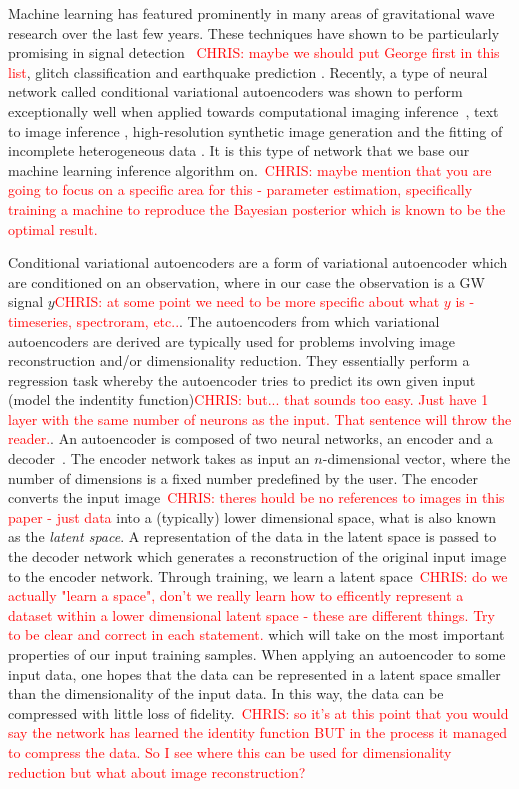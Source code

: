 \documentclass[%
showpacs,
 amsmath,amssymb,
 aps,
 twocolumn,
 prl,
 reprint,
floatfix,
]{revtex4-1}
\newcommand{\chris}[1]{\textcolor{red}{CHRIS: #1}}
\begin{document}
%
%
Machine learning has featured prominently in many areas of gravitational wave
research over the last few years. These techniques have shown to be
particularly promising in signal detection
\cite{PhysRevLett.120.141103,GEORGE201864,1904.08693}~\chris{maybe we should
put George first in this list}, glitch classification
\cite{1706.07446,0264-9381-34-6-064003} and earthquake prediction
\cite{Coughlin_2017}. Recently, a type of neural network called conditional
variational autoencoders was shown to perform exceptionally well when applied
towards computational imaging inference~\cite{1904.06264,NIPS2015_5775}, text
to image inference \cite{1512.00570}, high-resolution synthetic image
generation \cite{1612.00005} and the fitting of incomplete heterogeneous data
\cite{1807.03653}. It is this type of network that we base our machine learning
inference algorithm on.~\chris{maybe mention that you are going to focus on a
specific area for this - parameter estimation, specifically training a machine
to reproduce the Bayesian posterior which is known to be the optimal result.}

%
%
Conditional variational autoencoders are a form of variational autoencoder
which are conditioned on an observation, where in our case the observation is a
\ac{GW} signal $y$\chris{at some point we need to be more specific about what
$y$ is - timeseries, spectroram, etc..}. The autoencoders from which
variational autoencoders are derived are typically used for problems involving
image reconstruction and/or dimensionality reduction. They essentially perform
a regression task whereby the autoencoder tries to predict its own given input
(model the indentity function)\chris{but... that sounds too easy. Just have 1
layer with the same number of neurons as the input. That sentence will throw
the reader.}. An autoencoder is composed of two neural networks, an encoder and
a decoder~\cite{LIOU20083150}. The encoder network takes as input an
$n$-dimensional vector, where the number of dimensions is a fixed number
predefined by the user. The encoder converts the input image~\chris{theres
hould be no references to images in this paper - just data} into a (typically)
lower dimensional space, what is also known as the {\it{latent space}}. A
representation of the data in the latent space is passed to the decoder network
which generates a reconstruction of the original input image to the encoder
network. Through training, we learn a latent space~\chris{do we actually "learn
a space", don't we really learn how to efficently represent a dataset within a
lower dimensional latent space - these are different things. Try to be clear
and correct in each statement.} which will take on the most important
properties of our input training samples. When applying an autoencoder to some
input data, one hopes that the data can be represented in a latent space
smaller than the dimensionality of the input data.  In this way, the data can
be compressed with little loss of fidelity.~\chris{so it's at this point that
you would say the network has learned the identity function BUT in the process
it managed to compress the data. So I see where this can be used for
dimensionality reduction but what about image reconstruction?} 
\end{document}
